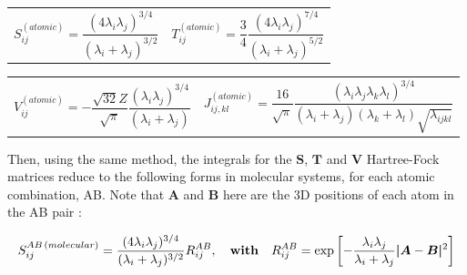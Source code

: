 \vspace{-0.7cm}
\begin{center}
\begin{tabular}{p{7cm}p{9.4cm}}

\begin{equation}\label{eq:AtomicS}
S_{ij}^{(atomic)}=\frac{(4\lambda_i\lambda_j)^{3/4}}{(\lambda_i+\lambda_j)^{3/2}}
\end{equation}

&

\begin{equation}\label{eq:AtomicT}
T_{ij}^{(atomic)}=\frac{3}{4}\frac{(4\lambda_i\lambda_j)^{7/4}}{(\lambda_i+\lambda_j)^{5/2}}
\end{equation}

\end{tabular}
\begin{tabular}{p{7cm}p{9.4cm}}

\begin{equation}\label{eq:AtomicV}
V_{ij}^{(atomic)}=-\frac{\sqrt{32}Z}{\sqrt{\pi}}\frac{(\lambda_i\lambda_j)^{3/4}}{(\lambda_i+\lambda_j)}
\end{equation}

&

\begin{equation}\label{eq:AtomicJ}
J_{ij,kl}^{(atomic)}=\frac{16}{\sqrt{\pi}}\frac{(\lambda_i\lambda_j\lambda_k\lambda_l)^{3/4}}{(\lambda_i+\lambda_j)(\lambda_k+\lambda_l)\sqrt{\lambda_{ijkl}}}
\end{equation}\\

\end{tabular}
\end{center}

\clearpage


Then, using the same method, the integrals for the $\boldsymbol{S}$, $\boldsymbol{T}$ and $\boldsymbol{V}$ Hartree-Fock matrices reduce to the following forms in molecular systems, for each atomic combination, AB. Note that $\boldsymbol{A}$ and $\boldsymbol{B}$ here are the 3D positions of each atom in the AB pair \cite{quiney_art_nodate}:

\begin{equation}\label{eq:MolecularS}
S_{ij}^{AB\thinspace(molecular)}=\frac{(4\lambda_i\lambda_j)^{3/4}}{(\lambda_i+\lambda_j)^{3/2}}R_{ij}^{AB}, \quad \textbf{with} \quad R_{ij}^{AB}=\exp\left[ -\frac{\lambda_i\lambda_j}{\lambda_i+\lambda_j} \boldsymbol{|}\boldsymbol{A}-\boldsymbol{B}\boldsymbol{|}^2\right]
\end{equation}

